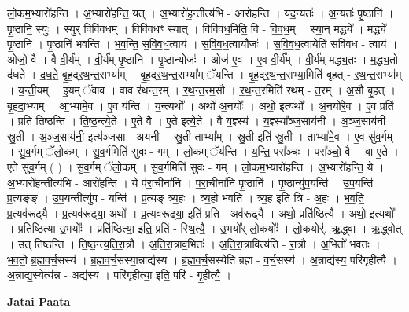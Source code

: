 \documentclass[17pt]{extarticle}
\begin{document}
लो॒कम॒भ्यारो॑हन्ति । अ॒भ्यारो॑हन्ति॒ यत् । अ॒भ्यारो॑ह॒न्तीत्य॑भि - आरो॑हन्ति । यद॒न्यतः॑ । अ॒न्यतः॑ पृ॒ष्ठानि॑ । पृ॒ष्ठानि॒ स्युः । स्युर् विवि॑वधम् । विवि॑वधꣳ स्यात् । विवि॑वध॒मिति॒ वि - वि॒व॒ध॒म् । स्या॒न् मद्ध्ये᳚ । मद्ध्ये॑ पृ॒ष्ठानि॑ । पृ॒ष्ठानि॑ भवन्ति । भ॒व॒न्ति॒ स॒वि॒व॒ध॒त्वाय॑ । स॒वि॒व॒ध॒त्वायौजः॑ । स॒वि॒व॒ध॒त्वायेति॑ सविवध - त्वाय॑ । ओजो॒ वै । वै वी॒र्य᳚म् । वी॒र्य॑म् पृ॒ष्ठानि॑ । पृ॒ष्ठान्योजः॑ । ओज॑ ए॒व । ए॒व वी॒र्य᳚म् । वी॒र्य॑म् मद्ध्य॒तः । म॒द्ध्य॒तो द॑धते । द॒ध॒ते॒ बृ॒ह॒द्‍र॒थ॒न्त॒राभ्या᳚म् । बृ॒ह॒द्‍र॒थ॒न्त॒राभ्या᳚म् ॅयन्ति । बृ॒ह॒द्‍र॒थ॒न्त॒राभ्या॒मिति॑ बृहत् - र॒थ॒न्त॒राभ्या᳚म् । य॒न्ती॒यम् । इ॒यम् ॅवाव । वाव र॑थन्त॒रम् । र॒थ॒न्त॒रम॒सौ । र॒थ॒न्त॒रमिति॑ रथम् - त॒रम् । अ॒सौ बृ॒हत् । बृ॒हदा॒भ्याम् । आ॒भ्यामे॒व । ए॒व य॑न्ति । य॒न्त्यथो᳚ । अथो॑ अ॒नयोः᳚ । अथो॒ इत्यथो᳚ । अ॒नयो॑रे॒व । ए॒व प्रति॑ । प्रति॑ तिष्ठन्ति । ति॒ष्ठ॒न्त्ये॒ते । ए॒ते वै । ए॒ते इत्ये॒ते । वै य॒ज्ञ्स्य॑ । य॒ज्ञ्स्या᳚ञ्ज॒साय॑नी । अ॒ञ्ज॒साय॑नी स्रु॒ती । अ॒ञ्ज॒साय॑नी॒ इत्य॑ञ्जसा - अय॑नी । स्रु॒ती ताभ्या᳚म् । स्रु॒ती इति॑ स्रु॒ती । ताभ्या॑मे॒व । ए॒व सु॑व॒र्गम् । सु॒व॒र्गम् ॅलो॒कम् । सु॒व॒र्गमिति॑ सुवः - गम् । लो॒कम् ॅय॑न्ति । य॒न्ति॒ परा᳚ञ्चः । परा᳚ञ्चो॒ वै । वा ए॒ते । ए॒ते सु॑व॒र्गम् ( ) । सु॒व॒र्गम् ॅलो॒कम् । सु॒व॒र्गमिति॑ सुवः - गम् । लो॒कम॒भ्यारो॑हन्ति । अ॒भ्यारो॑हन्ति॒ ये । अ॒भ्यारो॑ह॒न्तीत्य॑भि - आरो॑हन्ति । ये प॑रा॒चीना॑नि । प॒रा॒चीना॑नि पृ॒ष्ठानि॑ । पृ॒ष्ठान्यु॑प॒यन्ति॑ । उ॒प॒यन्ति॑ प्र॒त्यङ्‍ङ् । उ॒प॒यन्तीत्यु॑प - यन्ति॑ । प्र॒त्यङ् त्र्य॒हः । त्र्य॒हो भ॑वति । त्र्य॒ह इति॑ त्रि - अ॒हः । भ॒व॒ति॒ प्र॒त्यव॑रूढ्‍यै । प्र॒त्यव॑रूढ्‍या॒ अथो᳚ । प्र॒त्यव॑रूढ्‍या॒ इति॑ प्रति - अव॑रूढ्‍यै । अथो॒ प्रति॑ष्ठित्यै । अथो॒ इत्यथो᳚ । प्रति॑ष्ठित्या उ॒भयोः᳚ । प्रति॑ष्ठित्या॒ इति॒ प्रति॑ - स्थि॒त्यै॒ । उ॒भयो᳚र् लो॒कयोः᳚ । लो॒कयोर्॑. ऋ॒द्ध्वा । ऋ॒द्ध्वोत् । उत् ति॑ष्ठन्ति । ति॒ष्ठ॒न्त्य॒ति॒रा॒त्रौ । अ॒ति॒रा॒त्राव॒भितः॑ । अ॒ति॒रा॒त्रावित्य॑ति - रा॒त्रौ । अ॒भितो॑ भवतः । भ॒व॒तो॒ ब्र॒ह्म॒व॒र्च॒सस्य॑ । ब्र॒ह्म॒व॒र्च॒सस्या॒न्नाद्य॑स्य । ब्र॒ह्म॒व॒र्च॒सस्येति॑ ब्रह्म - व॒र्च॒सस्य॑ । अ॒न्नाद्य॑स्य॒ परि॑गृहीत्यै । अ॒न्नाद्य॒स्येत्य॑न्न - अद्य॑स्य । परि॑गृहीत्या॒ इति॒ परि॑ - गृ॒ही॒त्यै॒ । \newline

\textbf{Jatai Paata} \newline
\end{document}
